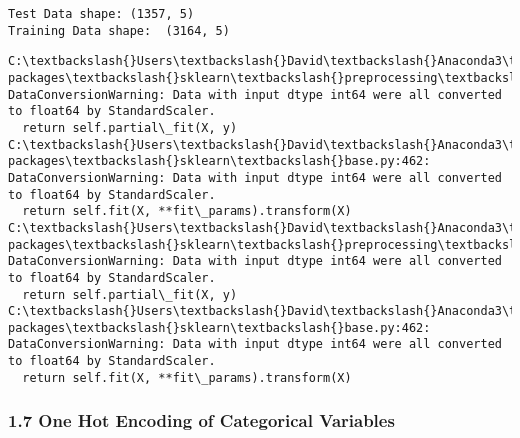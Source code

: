 \documentclass[11pt]{article}
\begin{document}
    \begin{Verbatim}[commandchars=\\\{\}]
Test Data shape: (1357, 5)
Training Data shape:  (3164, 5)

    \end{Verbatim}

    \begin{Verbatim}[commandchars=\\\{\}]
C:\textbackslash{}Users\textbackslash{}David\textbackslash{}Anaconda3\textbackslash{}lib\textbackslash{}site-packages\textbackslash{}sklearn\textbackslash{}preprocessing\textbackslash{}data.py:625: DataConversionWarning: Data with input dtype int64 were all converted to float64 by StandardScaler.
  return self.partial\_fit(X, y)
C:\textbackslash{}Users\textbackslash{}David\textbackslash{}Anaconda3\textbackslash{}lib\textbackslash{}site-packages\textbackslash{}sklearn\textbackslash{}base.py:462: DataConversionWarning: Data with input dtype int64 were all converted to float64 by StandardScaler.
  return self.fit(X, **fit\_params).transform(X)
C:\textbackslash{}Users\textbackslash{}David\textbackslash{}Anaconda3\textbackslash{}lib\textbackslash{}site-packages\textbackslash{}sklearn\textbackslash{}preprocessing\textbackslash{}data.py:625: DataConversionWarning: Data with input dtype int64 were all converted to float64 by StandardScaler.
  return self.partial\_fit(X, y)
C:\textbackslash{}Users\textbackslash{}David\textbackslash{}Anaconda3\textbackslash{}lib\textbackslash{}site-packages\textbackslash{}sklearn\textbackslash{}base.py:462: DataConversionWarning: Data with input dtype int64 were all converted to float64 by StandardScaler.
  return self.fit(X, **fit\_params).transform(X)

    \end{Verbatim}

    \hypertarget{one-hot-encoding-of-categorical-variables}{%
\subsubsection{1.7 \textbar{} One Hot Encoding of Categorical
Variables}\label{one-hot-encoding-of-categorical-variables}}
\end{document}
